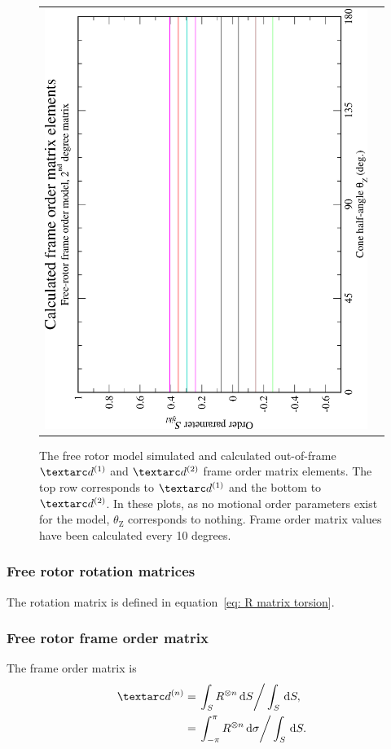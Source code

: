 \begin{figure}
\begin{tabular}{@{}cc@{}}
    \includegraphics[width=.35\textwidth,angle=270]{images/frame_order_matrix/Sijkl_free_rotor_out_of_frame_theta_z_calc.eps} \\
  \end{tabular}
  \caption[Free rotor simulated and calculated out-of-frame Daeg$^{(1)}$ and Daeg$^{(2)}$ elements.]{
    The free rotor model simulated and calculated out-of-frame $\FOone$ and $\FOtwo$ frame order matrix elements.
    The top row corresponds to $\FOone$ and the bottom to $\FOtwo$.
    In these plots, as no motional order parameters exist for the model, $\theta_\textrm{Z}$ corresponds to nothing.
    Frame order matrix values have been calculated every 10 degrees.
  }
  \label{fig: simulated and calculated out-of-frame 1st and 2nd degree free rotor frame order}
\end{figure}

\subsubsection{Free rotor rotation matrices}

The rotation matrix is defined in equation~\ref{eq: R matrix torsion}.

\subsubsection{Free rotor frame order matrix}

The frame order matrix is
\begin{subequations}
\begin{align}
    \FOn &= \left. \int_S R^{\otimes n} \diff S \right / \int_S \diff S , \\
         &= \left. \int_{-\pi}^{\pi} R^{\otimes n} \diff \sigma  \right / \int_S \diff S .
\end{align}
\end{subequations}

